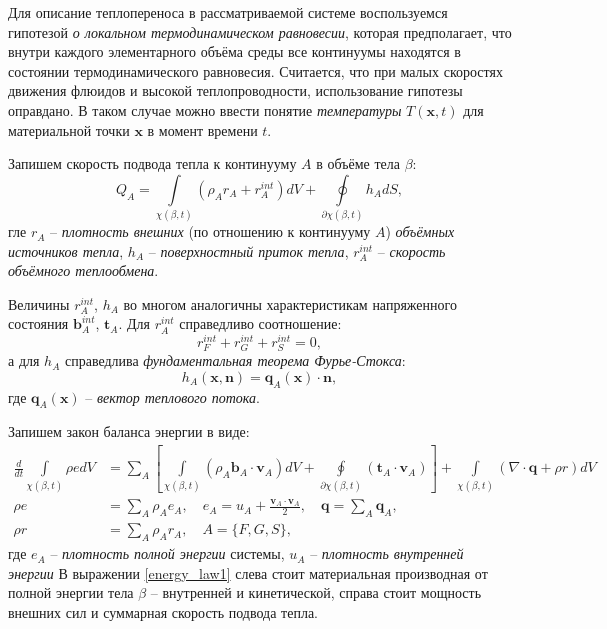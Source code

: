 	Для описание теплопереноса в рассматриваемой системе воспользуемся гипотезой \textit{о локальном термодинамическом равновесии}, которая предполагает, что внутри каждого элементарного объёма среды все континуумы находятся в состоянии термодинамического равновесия. Считается, что при малых скоростях движения флюидов и высокой теплопроводности, использование гипотезы оправдано. В таком случае можно ввести понятие \textit{температуры} $T(\boldsymbol{x}, t)$ для материальной точки $\boldsymbol{x}$ в момент времени $t$.

	Запишем скорость подвода тепла к континууму $A$ в объёме тела $\beta$:
\begin{equation}
	\label{heat_supply}
	Q_A = \int\limits_{\chi(\beta, t)}(\rho_A r_A + r_A^{int})dV + \oint\limits_{\partial \chi(\beta, t)} h_A dS,
\end{equation}
	гле $r_A$ -- \textit{плотность внешних} (по отношению к континууму $A$) \textit{объёмных источников тепла},
	$h_A$ -- \textit{поверхностный приток тепла},
	$r_A^{int}$ -- \textit{скорость объёмного теплообмена}.

	Величины $r_A^{int}$, $h_A$ во многом аналогичны характеристикам напряженного состояния $\boldsymbol{b}_A^{int}$, $\boldsymbol{t}_A$. Для $r_A^{int}$ справедливо соотношение:
\begin{equation}
	\label{heat_exchange}
	r_F^{int} + r_G^{int} + r_S^{int} = 0,
\end{equation}
	а для $h_A$ справедлива \textit{фундаментальная теорема Фурье-Стокса}:
\begin{equation}
	\label{fourier_stocks}
	h_A(\boldsymbol{x}, \boldsymbol{n}) = \boldsymbol{q}_A(\boldsymbol{x}) \cdot \boldsymbol{n},
\end{equation}
	где $\boldsymbol{q}_A(\boldsymbol{x})$ -- \textit{вектор теплового потока}.

	Запишем закон баланса энергии в виде:
\begin{align}
	\label{energy_law1}
	\frac{d}{dt}\int\limits_{\chi(\beta, t)} \rho e dV &= \sum_A\left[\int\limits_{\chi(\beta, t)}\left(\rho_A\boldsymbol{b}_A\cdot\boldsymbol{v}_A\right)dV + \oint\limits_{\partial\chi(\beta, t)}\left(\boldsymbol{t}_A \cdot \boldsymbol{v}_A\right)\right] + \int\limits_{\chi(\beta, t)}\left(\nabla \cdot \boldsymbol{q} + \rho r\right)dV\\
	\label{energy_law2}
	\rho e &= \sum_A \rho_A e_A, \quad e_A = u_A + \frac{\boldsymbol{v}_A \cdot \boldsymbol{v}_A}{2}, \quad \boldsymbol{q} = \sum\limits_A \boldsymbol{q}_A,\\
	\label{energy_law3}
	\rho r &= \sum\limits_{A} \rho_A r_A, \quad A = \{F, G, S\},
\end{align}
	где $e_A$ -- \textit{плотность полной энергии} системы,
	$u_A$ -- \textit{плотность внутренней энергии}
	В выражении \eqref{energy_law1} слева стоит материальная производная от полной энергии тела $\beta$ -- внутренней и кинетической, справа стоит мощность внешних сил и суммарная скорость подвода тепла.

